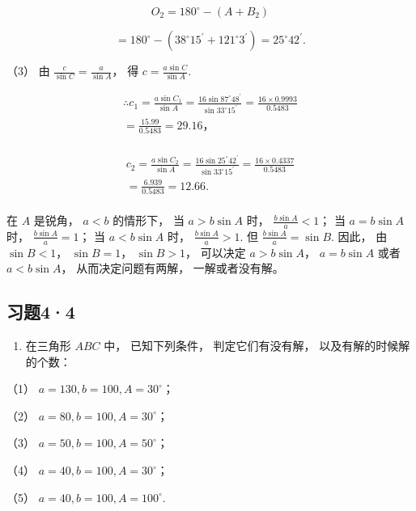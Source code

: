 \[
O _ {2} = 180 ^{\circ} - (A + B _ {2})
\]

\[
= 180 ^{\circ} - (38 ^{\circ} 15 ^{\prime} + 121 ^{\circ} 3 ^{\prime}) = 25 ^{\circ} 42 ^{\prime}.
\]

（3） 由 \(\frac{c}{\sin C} = \frac{a}{\sin A}\)， 得
\(c = \frac{a \sin C}{\sin A}\).

\[
\begin{array}{l} \therefore c _ {1} = \frac {a \sin C _ {1}}{\sin A} = \frac {16 \sin 87 ^{\circ} 48 ^{\prime}}{\sin 33 ^{\circ} 15 ^{\prime}} = \frac {16 \times 0.9993}{0.5483} \\ = \frac {15.99}{0.5483} = 29.16\text{，} \\ \end{array}
\]

\[
\begin{array}{l} c _ {2} = \frac {a \sin C _ {2}}{\sin A} = \frac {16 \sin 25 ^{\circ} 42 ^{\prime}}{\sin 33 ^{\circ} 15 ^{\prime}} = \frac {16 \times 0.4337}{0.5483} \\ = \frac {6.939}{0.5483} = 12.66. \\ \end{array}
\]

 在 \(A\) 是锐角， \(a < b\) 的情形下， 当
\(a > b \sin A\) 时， \(\frac{b \sin A}{a} < 1\)； 当 \(a = b \sin A\)
时， \(\frac{b \sin A}{a} = 1\)； 当 \(a < b \sin A\) 时，
\(\frac{b \sin A}{a} > 1\). 但 \(\frac{b \sin A}{a} = \sin B\). 因此，
由 \(\sin B < 1\)， \(\sin B = 1\)， \(\sin B > 1\)， 可以决定
\(a > b \sin A\)， \(a = b \sin A\) 或者 \(a < b \sin A\)，
从而决定问题有两解， 一解或者没有解。

\subsection{习题4·4}

\begin{enumerate}
\item
  在三角形 \(ABC\) 中， 已知下列条件， 判定它们有没有解，
  以及有解的时候解的个数：
\end{enumerate}

（1） \(a = 130, b = 100, A = 30^{\circ}\)；

（2） \(a = 80, b = 100, A = 30^{\circ}\)；

（3） \(a = 50, b = 100, A = 50^{\circ}\)；

（4） \(a = 40, b = 100, A = 30^{\circ}\)；

（5） \(a = 40, b = 100, A = 100^{\circ}\).

